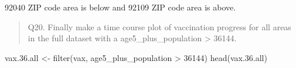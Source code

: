 \documentclass[
]{article}
\newenvironment{Shaded}{\begin{snugshade}}{\end{snugshade}}
\newcommand{\DecValTok}[1]{\textcolor[rgb]{0.00,0.00,0.81}{#1}}
\newcommand{\FloatTok}[1]{\textcolor[rgb]{0.00,0.00,0.81}{#1}}
\newcommand{\FunctionTok}[1]{\textcolor[rgb]{0.00,0.00,0.00}{#1}}
\newcommand{\NormalTok}[1]{#1}
\newcommand{\OtherTok}[1]{\textcolor[rgb]{0.56,0.35,0.01}{#1}}
\newcommand{\SpecialCharTok}[1]{\textcolor[rgb]{0.00,0.00,0.00}{#1}}
\begin{document}
92040 ZIP code area is below and 92109 ZIP code area is above.

\begin{quote}
Q20. Finally make a time course plot of vaccination progress for all
areas in the full dataset with a age5\_plus\_population \textgreater{}
36144.
\end{quote}

\begin{Shaded}
\begin{Highlighting}[]
\NormalTok{vax.}\FloatTok{36.}\NormalTok{all }\OtherTok{\textless{}{-}} \FunctionTok{filter}\NormalTok{(vax, age5\_plus\_population }\SpecialCharTok{\textgreater{}} \DecValTok{36144}\NormalTok{)}
\FunctionTok{head}\NormalTok{(vax.}\FloatTok{36.}\NormalTok{all)}
\end{Highlighting}
\end{Shaded}
\end{document}

